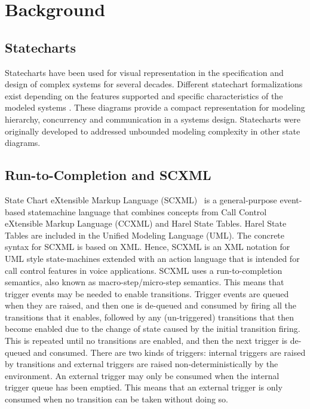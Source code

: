\section{Background}
\label{sec:background}


\subsection{Statecharts}
\label{sec:statecharts}

Statecharts have been used for visual representation in the specification and design of complex systems for several decades. Different statechart formalizations exist depending on the features supported and specific characteristics of the modeled systems \cite{HAREL1987231,harel1996executable}. These diagrams provide a compact representation for modeling hierarchy, concurrency and communication in a systems design.
Statecharts were originally developed to addressed unbounded modeling complexity in other state diagrams. 

\subsection{Run-to-Completion and SCXML}
\label{sec:run-to-completion}

State Chart eXtensible Markup Language (SCXML)~\cite{scxmlwebsite} is a 
general-purpose event-based statemachine language that combines concepts 
from Call Control eXtensible Markup Language (CCXML) and Harel State Tables. 
Harel State Tables are included in the Unified Modeling Language (UML). 
The concrete syntax for SCXML is based on XML. Hence, SCXML is an XML 
notation for UML style state-machines extended with an action language 
that is intended for call control features in voice applications. SCXML 
uses a run-to-completion semantics, also known as macro-step/micro-step 
semantics. This means that trigger events may be needed to enable transitions. 
Trigger events are queued when they are raised, and then one is de-queued and
consumed by firing all the transitions that it enables, followed by any 
(un-triggered) transitions that then become enabled due to the change of 
state caused by the initial transition firing. This is repeated until no 
transitions are enabled, and then the next trigger is de-queued and consumed. 
There are two kinds of triggers: internal triggers are raised by transitions
and external triggers are raised non-deterministically by the environment. An external trigger may only be consumed 
when the internal trigger queue has been emptied. This means that an external 
trigger is only consumed when no transition can be taken without doing so.

